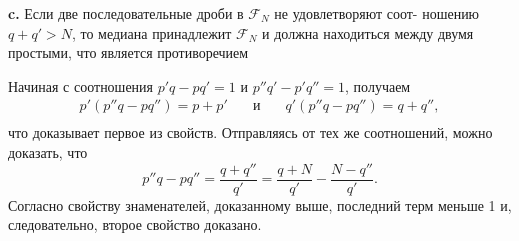\documentclass{mai_book}
\begin{document}
\pagebreak

\textbf{c.} Если две последовательные дроби в $\mathcal{F}_N$ не удовлетворяют соот-­\linebreak
ношению $q + q' > N$, то медиана принадлежит $\mathcal{F}_N$ и должна находиться\linebreak
между двумя простыми, что является противоречием

Начиная с соотношения $p'q - pq' = 1$ и $p''q' - p'q'' = 1$,  получаем
		$$\begin{array}{cccc}
				p'(p''q - pq'') = p + p' & \quad\text{и}\quad & q'(p{''}q - pq{''}) = q + q'',\\
		\end{array}$$
что доказывает первое из свойств. Отправляясь от тех же соотношений,\linebreak
можно доказать, что 
$$p''q - pq'' = \frac{q + q''}{q'} = \frac{q + N}{q'} - \frac{N - q''}{q'}.$$
\noindent Согласно свойству знаменателей, доказанному выше, последний терм\linebreak
меньше 1 и, следовательно, второе свойство доказано.
\end{document}
